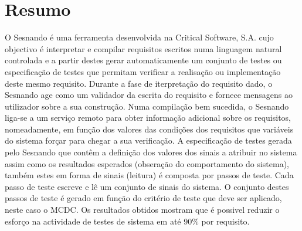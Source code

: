 \chapter*{Resumo}
\label{ch:summary}

O Sesnando é uma ferramenta desenvolvida na Critical Software, S.A. cujo objectivo é interpretar e compilar requisitos escritos numa linguagem natural controlada e a partir destes gerar automaticamente um conjunto de testes ou especificação de testes que permitam verificar a realisação ou implementação deste mesmo requisito. Durante a fase de iterpretação do requisito dado, o Sesnando age como um validador da escrita do requisito e fornece mensagens ao utilizador sobre a sua construção. Numa compilação bem sucedida, o Sesnando liga-se a um serviço remoto para obter informação adicional sobre os requisitos, nomeadamente, em função dos valores das condições dos requisitos que variáveis do sistema forçar para chegar a sua verificação. A especificação de testes gerada pelo Sesnando que contêm a definição dos valores dos sinais a atribuir no sistema assim como os resultados esperados (obseração do comportamento do sistema), também estes em forma de sinais (leitura) é composta por passos de teste. Cada passo de teste escreve e lê um conjunto de sinais do sistema. O conjunto destes passos de teste é gerado em função do critério de teste que deve ser aplicado, neste caso o MCDC. Os resultados obtidos mostram que é possivel reduzir o esforço na actividade de testes de sistema em até 90\% por requisito.